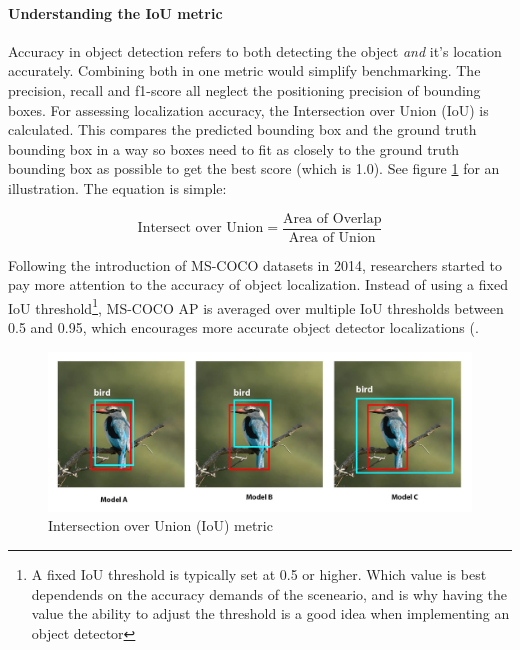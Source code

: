 \paragraph{Understanding the IoU metric}

Accuracy in object detection refers to both detecting the object \textit{and} it's location accurately. Combining both in one metric would simplify benchmarking. The precision, recall and f1-score all neglect the positioning precision of bounding boxes. For assessing localization accuracy, the Intersection over Union (IoU) is calculated. This compares the predicted bounding box and the ground truth bounding box in a way so boxes need to fit as closely to the ground truth bounding box as possible to get the best score (which is 1.0). See figure \ref{fig:IoU} for an illustration. The equation is simple:

\[
    \text{Intersect over Union} = \frac{\text{Area of Overlap}}{\text{Area of Union}}
\]

Following the introduction of MS-COCO datasets in 2014, researchers started to pay more attention to the accuracy of object localization. Instead of using a fixed IoU threshold\footnote{A fixed IoU threshold is typically set at 0.5 or higher. Which value is best dependends on the accuracy demands of the sceneario, and is why having the value the ability to adjust the threshold is a good idea when implementing an object detector}, MS-COCO AP is averaged over multiple IoU thresholds between 0.5 and 0.95, which encourages more accurate object detector localizations (\cite{zou2023object_detection_in_20_years}.

\begin{figure}
    \centering
    \includegraphics[width=0.5\linewidth]{Images/Diagrams/IoU.jpg}
    \caption{Intersection over Union (IoU) metric}
    \label{fig:IoU}
\end{figure}




